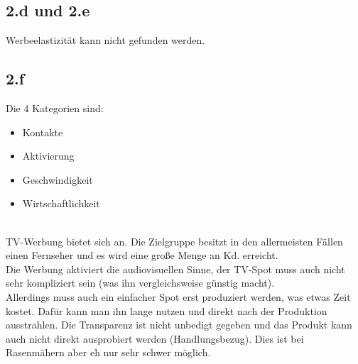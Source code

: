 \subsection{2.d und 2.e}
    Werbeelastizität kann nicht gefunden werden.

\subsection{2.f}
    Die 4 Kategorien sind:
    \begin{itemize}
        \item Kontakte
        \item Aktivierung
        \item Geschwindigkeit
        \item Wirtschaftlichkeit
    \end{itemize}
    \ \\
    TV-Werbung bietet sich an. Die Zielgruppe besitzt in den allermeisten Fällen einen Fernseher und es wird eine große Menge an Kd. erreicht. \\
    Die Werbung aktiviert die audiovisuellen Sinne, der TV-Spot muss auch nicht sehr kompliziert sein (was ihn vergleichsweise günstig macht). \\
    Allerdings muss auch ein einfacher Spot erst produziert werden, was etwas Zeit kostet. Dafür kann man ihn lange nutzen und direkt nach der Produktion ausstrahlen.
    Die Transparenz ist nicht unbedigt gegeben und das Produkt kann auch nicht direkt ausprobiert werden (Handlungsbezug). Dies ist bei Rasenmähern aber eh nur sehr schwer möglich. \\
    \ \\
    